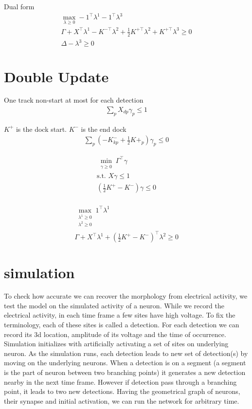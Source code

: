 \documentclass{article}
\begin{document}
Dual form
\begin{align}
\max_{\lambda \geq 0}-1^{\top }\lambda^1-1^{\top}\lambda^{3}\\
\nonumber \Gamma+X^{\top}\lambda^1-K^{-\top}\lambda^2+\frac{1}{2}K^{+\top}\lambda^2 +K^{+\top}\lambda^3\geq 0\\
\nonumber \Delta -\lambda^3 \geq 0
\end{align}


\section {Double Update}

One track non-start at most for each detection
\begin{align}
\sum_{p} X_{dp}\gamma_p \leq 1
\end{align}

$K^+$ is the dock start.  $K^-$ is the end dock
\begin{align}
\sum_{p}(-K^-_{kp}+\frac{1}{2}K+_p)\gamma_p \leq 0
\end{align}

\begin{align}
\min_{\substack{\gamma \geq 0 }}\Gamma^{\top}\gamma \\
\nonumber \mbox{s.t.   } X\gamma \leq 1\\
\nonumber (\frac{1}{2}K^+  -K^-)\gamma \leq 0\\
\end{align}

\begin{align}
\max_{\substack{\lambda^1 \geq 0 \\ \lambda^2 \geq 0}}1^{\top }\lambda^1\\
\nonumber \Gamma+X^\top \lambda^1+(\frac{1}{2}K^+ -K^-)^{\top}\lambda^2	 \geq 0
\end{align}

\section{simulation}
 To check how accurate we can recover the morphology from electrical activity, we test the model on the simulated activity of a neuron. While we record the electrical activity, in each time frame a few sites have high voltage. To fix the terminology, each of these sites is called a detection. For each detection we can record its 3d location, amplitude of its voltage and the time of occurrence. Simulation initializes with artificially activating a set of sites on underlying neuron. As the simulation runs, each detection leads to new set of detection(s) by moving on the underlying neurons. When a detection is on a segment (a segment is the part of neuron between two branching points) it generates a new detection nearby in the next time frame. However if detection pass through a branching point, it leads to two new detections. Having the geometrical graph of neurons, their synapse and initial activation, we can run the network for arbitrary time. 
\end{document}
